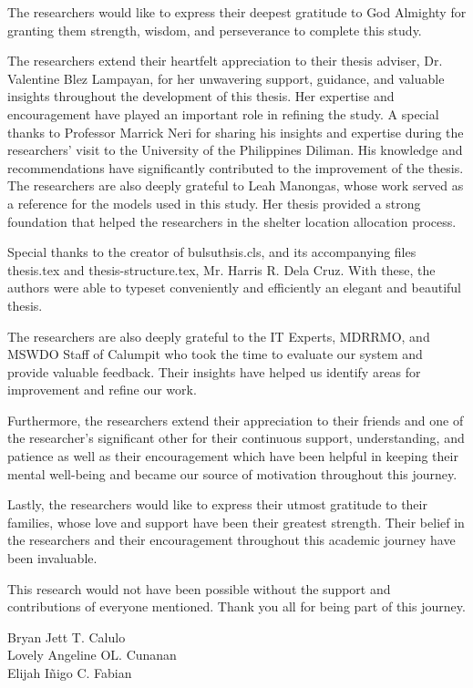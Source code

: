 \begin{acknowledgment}
	The researchers would like to express their deepest gratitude to God Almighty for granting them strength, wisdom, and perseverance to complete this study.
	
	The researchers extend their heartfelt appreciation to their thesis adviser, Dr. Valentine Blez Lampayan, for her unwavering support, guidance, and valuable insights throughout the development of this thesis. Her expertise and encouragement have played an important role in refining the study. A special thanks to Professor Marrick Neri for sharing his insights and expertise during the researchers’ visit to the University of the Philippines Diliman. His knowledge and recommendations have significantly contributed to the improvement of the thesis. The researchers are also deeply grateful to Leah Manongas, whose work served as a reference for the models used in this study. Her thesis provided a strong foundation that helped the researchers in the shelter location allocation process. 
	
	Special thanks to the creator of bulsuthsis.cls, and its accompanying files thesis.tex and thesis-structure.tex, Mr. Harris R. Dela Cruz. With these, the authors were able to typeset conveniently and efficiently an elegant and beautiful thesis.
	
	The researchers are also deeply grateful to the IT Experts, MDRRMO, and MSWDO Staff of Calumpit who took the time to evaluate our system and provide valuable feedback. Their insights have helped us identify areas for improvement and refine our work. 
	
	Furthermore, the researchers extend their appreciation to their friends and one of the researcher’s significant other for their continuous support, understanding, and patience as well as their encouragement which have been helpful in keeping their mental well-being and became our source of motivation throughout this journey.
	
	Lastly, the researchers would like to express their utmost gratitude to their families, whose love and support have been their greatest strength. Their belief in the researchers and their encouragement throughout this academic journey have been invaluable.
	
	This research would not have been possible without the support and contributions of everyone mentioned. Thank you all for being part of this journey.
	
	\begin{flushright}
	Bryan Jett T. Calulo\\
	Lovely Angeline OL. Cunanan\\
	Elijah Iñigo C. Fabian\\
	\end{flushright}

\end{acknowledgment}
